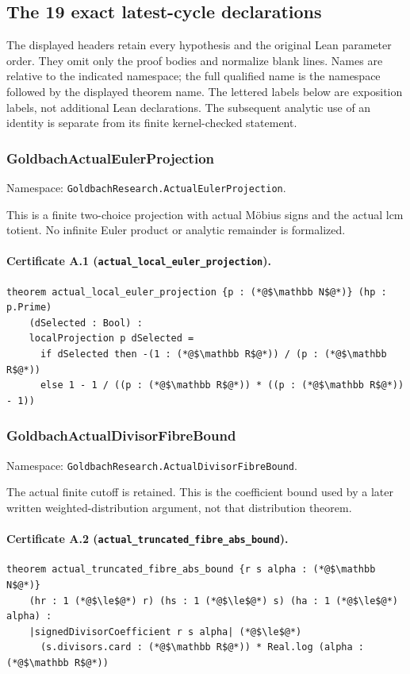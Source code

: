 \documentclass[11pt,a4paper]{article}
\theoremstyle{definition}
\theoremstyle{remark}
\begin{document}
\subsection{The 19 exact latest-cycle declarations}

The displayed headers retain every hypothesis and the original Lean
parameter order. They omit only the proof bodies and normalize blank
lines. Names are relative to the indicated namespace; the full
qualified name is the namespace followed by the displayed theorem name.
The lettered labels below are exposition labels, not additional Lean
declarations. The subsequent analytic use of an identity is separate
from its finite kernel-checked statement.

\subsubsection{GoldbachActualEulerProjection}
Namespace: \nolinkurl{GoldbachResearch.ActualEulerProjection}.

This is a finite two-choice projection with actual M\"obius signs and the actual lcm totient. No infinite Euler product or analytic remainder is formalized.

\paragraph{Certificate A.1 (\texttt{actual\_local\_euler\_projection}).}
\begin{lstlisting}
theorem actual_local_euler_projection {p : (*@$\mathbb N$@*)} (hp : p.Prime)
    (dSelected : Bool) :
    localProjection p dSelected =
      if dSelected then -(1 : (*@$\mathbb R$@*)) / (p : (*@$\mathbb R$@*))
      else 1 - 1 / ((p : (*@$\mathbb R$@*)) * ((p : (*@$\mathbb R$@*)) - 1))
\end{lstlisting}

\subsubsection{GoldbachActualDivisorFibreBound}
Namespace: \nolinkurl{GoldbachResearch.ActualDivisorFibreBound}.

The actual finite cutoff is retained. This is the coefficient bound used by a later written weighted-distribution argument, not that distribution theorem.

\paragraph{Certificate A.2 (\texttt{actual\_truncated\_fibre\_abs\_bound}).}
\begin{lstlisting}
theorem actual_truncated_fibre_abs_bound {r s alpha : (*@$\mathbb N$@*)}
    (hr : 1 (*@$\le$@*) r) (hs : 1 (*@$\le$@*) s) (ha : 1 (*@$\le$@*) alpha) :
    |signedDivisorCoefficient r s alpha| (*@$\le$@*)
      (s.divisors.card : (*@$\mathbb R$@*)) * Real.log (alpha : (*@$\mathbb R$@*))
\end{lstlisting}
\end{document}
